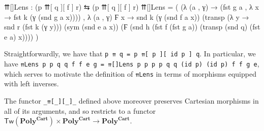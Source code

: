 \documentclass[
  11pt,
  oneside,
  article]{memoir}
\newenvironment{Shaded}{}{}
\newcommand{\NormalTok}[1]{#1}
\newcommand{\OtherTok}[1]{\textcolor[rgb]{0.00,0.44,0.13}{#1}}
\theoremstyle{definition}
\theoremstyle{plain}
\newcommand{\Cat}[1]{\mathbf{#1}}%
\newcommand{\poly}{\Cat{Poly}}
\newcommand{\0}{\textsf{0}}
\newcommand{\1}{\tn{\textsf{1}}}
\begin{document}
\begin{Shaded}
\begin{Highlighting}[]
\NormalTok{    ⇈[]Lens }\OtherTok{:} \OtherTok{(}\NormalTok{p ⇈[ q ][ f ] r}\OtherTok{)}\NormalTok{ ⇆ }\OtherTok{(}\NormalTok{p\textquotesingle{} ⇈[ q\textquotesingle{} ][ f\textquotesingle{} ] r\textquotesingle{}}\OtherTok{)}
\NormalTok{    ⇈[]Lens }\OtherTok{=} 
        \OtherTok{(} \OtherTok{(λ} \OtherTok{(}\NormalTok{a , γ}\OtherTok{)} \OtherTok{→} \OtherTok{(}\NormalTok{fst g a , }\OtherTok{λ}\NormalTok{ x }\OtherTok{→}\NormalTok{ fst k }\OtherTok{(}\NormalTok{γ }\OtherTok{(}\NormalTok{snd g a x}\OtherTok{))))} 
\NormalTok{        , }\OtherTok{λ} \OtherTok{(}\NormalTok{a , γ}\OtherTok{)}\NormalTok{ Ϝ x }\OtherTok{→}
\NormalTok{            snd k }\OtherTok{(}\NormalTok{γ }\OtherTok{(}\NormalTok{snd f a x}\OtherTok{))} 
               \OtherTok{(}\NormalTok{transp }\OtherTok{(λ}\NormalTok{ y }\OtherTok{→}\NormalTok{ snd r\textquotesingle{} }\OtherTok{(}\NormalTok{fst k }\OtherTok{(}\NormalTok{γ y}\OtherTok{)))} 
                       \OtherTok{(}\NormalTok{sym }\OtherTok{(}\NormalTok{snd e a x}\OtherTok{))} 
                       \OtherTok{(}\NormalTok{Ϝ }\OtherTok{(}\NormalTok{snd h }\OtherTok{(}\NormalTok{fst f\textquotesingle{} }\OtherTok{(}\NormalTok{fst g a}\OtherTok{))} 
                              \OtherTok{(}\NormalTok{transp }\OtherTok{(}\NormalTok{snd q}\OtherTok{)} \OtherTok{(}\NormalTok{fst e a}\OtherTok{)}\NormalTok{ x}\OtherTok{))))} \OtherTok{)}
\end{Highlighting}
\end{Shaded}

Straightforwardly, we have that
\texttt{p\ ⇈\ q\ =\ p\ ⇈{[}\ p\ {]}{[}\ id\ p\ {]}\ q}. In particular,
we have
\texttt{⇈Lens\ p\ p\textquotesingle{}\ q\ q\textquotesingle{}\ f\ f\textquotesingle{}\ e\ g\ =\ ⇈{[}{]}Lens\ p\ p\textquotesingle{}\ p\ p\textquotesingle{}\ q\ q\textquotesingle{}\ (id\ p)\ (id\ p\textquotesingle{})\ f\ f\textquotesingle{}\ g\ e},
which serves to motivate the definition of \texttt{⇈Lens} in terms of
morphisms equipped with left inverses.

The functor \texttt{\_⇈{[}\_{]}{[}\_{]}\_} defined above moreover
preserves Cartesian morphisms in all of its arguments, and so restricts
to a functor
\(\mathsf{Tw}(\poly^{\mathbf{Cart}}) \times \poly^\mathbf{Cart} \to \poly^\mathbf{Cart}\).
\end{document}
